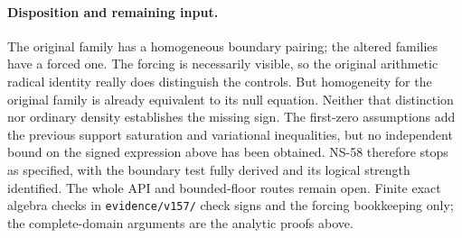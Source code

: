 \paragraph{Disposition and remaining input.}
The original family has a homogeneous boundary pairing; the altered
families have a forced one. The forcing is necessarily visible, so
the original arithmetic radical identity really does distinguish the
controls. But homogeneity for the original family is already equivalent
to its null equation. Neither that distinction nor ordinary density
establishes the missing sign. The first-zero assumptions add the
previous support saturation and variational inequalities, but no
independent bound on the signed expression above has been obtained.
NS-58 therefore stops as specified, with the boundary test fully
derived and its logical strength identified. The whole API and
bounded-floor routes remain open. Finite exact algebra checks in
\texttt{evidence/v157/} check signs and the forcing bookkeeping only;
the complete-domain arguments are the analytic proofs above.
